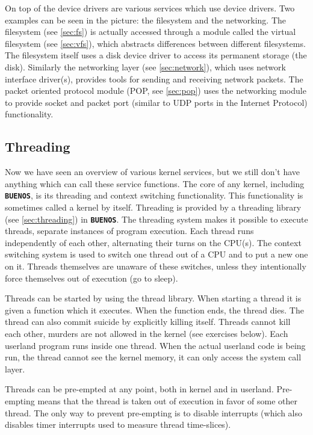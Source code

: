 \documentclass[twoside,a4paper]{report}
\newcommand{\buenos}{\texttt{\textbf{BUENOS}}}
\begin{document}
On top of the device drivers are various services which use device
drivers. Two examples can be seen in the picture: the filesystem and
the networking. The filesystem (see \autoref{sec:fs}) is actually
accessed through a module called the virtual filesystem (see
\autoref{sec:vfs}), which abstracts differences between different
filesystems. The filesystem itself uses a disk device driver to access
its permanent storage (the disk). Similarly the networking layer (see
\autoref{sec:network}), which uses network interface driver(s),
provides tools for sending and receiving network packets. The packet
oriented protocol module (POP, see \autoref{sec:pop}) uses the
networking module to provide socket and packet port (similar to UDP
ports in the Internet Protocol) functionality.

\subsection{Threading}


Now we have seen an overview of various kernel services, but we still
don't have anything which can call these service functions. The core
of any kernel, including \buenos{}, is its threading and context
switching functionality. This functionality is sometimes called a
kernel by itself. Threading is provided by a threading library (see
\autoref{sec:threading}) in \buenos{}. The threading system makes it
possible to execute threads, separate instances of program
execution. Each thread runs independently of each other, alternating
their turns on the CPU(s). The context switching system is used to
switch one thread out of a CPU and to put a new one on it. Threads
themselves are unaware of these switches, unless they intentionally
force themselves out of execution (go to sleep).

Threads can be started by using the thread library. When starting a
thread it is given a function which it executes. When the function
ends, the thread dies. The thread can also commit suicide by
explicitly killing itself. Threads cannot kill each other, murders are
not allowed in the kernel (see exercises below). Each userland program
runs inside one thread. When the actual userland code is being run,
the thread cannot see the kernel memory, it can only access the system
call layer.

Threads can be pre-empted at any point, both in kernel and in
userland. Pre-empting means that the thread is taken out of execution
in favor of some other thread. The only way to prevent pre-empting is
to disable interrupts (which also disables timer interrupts used to
measure thread time-slices).
\end{document}
